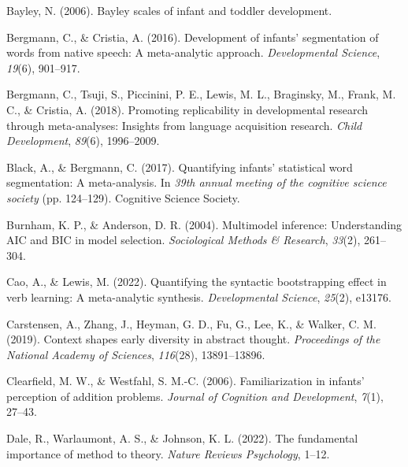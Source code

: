 \documentclass[10pt, letterpaper]{article}
\newenvironment{CSLReferences}%
  {}%
  {\par}
\begin{document}
\hypertarget{refs}{}
\begin{CSLReferences}{1}{0}
\leavevmode{}%
Bayley, N. (2006). Bayley scales of infant and toddler development.

\leavevmode{}%
Bergmann, C., \& Cristia, A. (2016). Development of infants'
segmentation of words from native speech: A meta-analytic approach.
\emph{Developmental Science}, \emph{19}(6), 901--917.

\leavevmode{}%
Bergmann, C., Tsuji, S., Piccinini, P. E., Lewis, M. L., Braginsky, M.,
Frank, M. C., \& Cristia, A. (2018). Promoting replicability in
developmental research through meta-analyses: Insights from language
acquisition research. \emph{Child Development}, \emph{89}(6),
1996--2009.

\leavevmode{}%
Black, A., \& Bergmann, C. (2017). Quantifying infants' statistical word
segmentation: A meta-analysis. In \emph{39th annual meeting of the
cognitive science society} (pp. 124--129). Cognitive Science Society.

\leavevmode{}%
Burnham, K. P., \& Anderson, D. R. (2004). Multimodel inference:
Understanding AIC and BIC in model selection. \emph{Sociological Methods
\& Research}, \emph{33}(2), 261--304.

\leavevmode{}%
Cao, A., \& Lewis, M. (2022). Quantifying the syntactic bootstrapping
effect in verb learning: A meta-analytic synthesis. \emph{Developmental
Science}, \emph{25}(2), e13176.

\leavevmode{}%
Carstensen, A., Zhang, J., Heyman, G. D., Fu, G., Lee, K., \& Walker, C.
M. (2019). Context shapes early diversity in abstract thought.
\emph{Proceedings of the National Academy of Sciences}, \emph{116}(28),
13891--13896.

\leavevmode{}%
Clearfield, M. W., \& Westfahl, S. M.-C. (2006). Familiarization in
infants' perception of addition problems. \emph{Journal of Cognition and
Development}, \emph{7}(1), 27--43.

\leavevmode{}%
Dale, R., Warlaumont, A. S., \& Johnson, K. L. (2022). The fundamental
importance of method to theory. \emph{Nature Reviews Psychology}, 1--12.


\end{CSLReferences}
\end{document}
